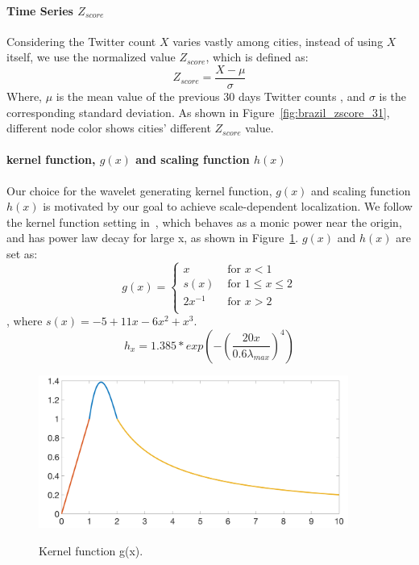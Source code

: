 \paragraph{Time Series $Z_{score}$}
Considering the Twitter count $X$ varies vastly among cities,  instead of using $X$ itself, we use the normalized value $Z_{score}$, which is defined as:
\begin{equation}
\label{eq:Z_score}
Z_{score}= \frac{X-\mu}{\sigma}
\end{equation}Where, $\mu$ is the mean value of the previous $30$ days Twitter counts , and $\sigma$ is the corresponding standard deviation. As shown in Figure~\ref{fig:brazil_zscore_31}, different node color shows cities' different $Z_{score}$ value.



\paragraph{kernel function, $g(x)$ and scaling function $h(x)$}
Our choice for the wavelet generating kernel function, $g(x)$ and scaling function $h(x)$ is motivated by our goal to achieve scale-dependent localization. We follow the kernel function setting in~\cite{hammond2011wavelets}, which behaves as a monic power near the origin, and has power law decay for large x, as shown in Figure~\ref{kernel_function}. $g(x)$ and $h(x)$ are set as:
\begin{equation}
g(x) = \left\{ \begin{array}{rl}
 x &\mbox{ for $x<1$} \\
s(x) &\mbox{ for $1\leq x \leq 2$} \\
 2x^{-1} &\mbox{ for $x>2$} \\
       \end{array} \right.
\end{equation}, where $s(x)=-5+11x-6x^2+x^3$.
\begin{equation}
h_{x}= 1.385*exp(-(\frac{20x}{0.6\lambda_{max}})^4)
\end{equation}


\begin{figure}[h]
	\centering
    {
		\includegraphics[width= 4in] {figures/kernel_function.png}
		\label{fig:kernel_function}
	}
	\caption{Kernel function g(x).}
	\label{kernel_function}
\end{figure}


